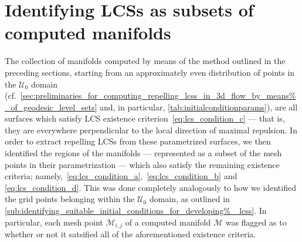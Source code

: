 \section{Identifying LCSs as subsets of computed manifolds}
\label{sec:identifying_lcss_as_subsets_of_computed_manifolds}

The collection of manifolds computed by means of the method
outlined in the preceding sections, starting from an approximately
even distribution of points in the $\mathcal{U}_{0}$ domain
(cf.\ \cref{sec:preliminaries_for_computing_repelling_lcss_in_3d_flow_by_means%
_of_geodesic_level_sets} and, in particular,
\cref{tab:initialconditionparams}), are all surfaces which satisfy LCS
existence criterion~\eqref{eq:lcs_condition_c} --- that is, they are everywhere
perpendicular to the local direction of maximal repulsion. In order to extract
repelling LCSs from these parametrized surfaces, we then identified the regions
of the manifolds --- represented as a subset of the mesh points in their
parametrization --- which also satisfy the remaining existence criteria;
namely,~\eqref{eq:lcs_condition_a},~\eqref{eq:lcs_condition_b} and~%
\eqref{eq:lcs_condition_d}. This was done completely analogously to how we
identified the grid points belonging within the $\mathcal{U}_{0}$ domain, as
outlined in \cref{sub:identifying_suitable_initial_conditions_for_developing%
_lcss}. In particular, each mesh point $\mathcal{M}_{i,j}$ of a computed
manifold $\mathcal{M}$ was flagged as to whether or not it satsified all
of the aforementioned existence criteria.


